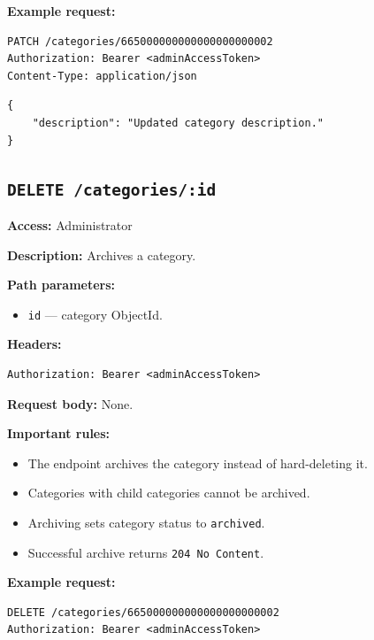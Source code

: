 \textbf{Example request:}

\begin{verbatim}
PATCH /categories/665000000000000000000002
Authorization: Bearer <adminAccessToken>
Content-Type: application/json
\end{verbatim}

\begin{verbatim}
{
    "description": "Updated category description."
}
\end{verbatim}

\subsection{\texttt{DELETE /categories/:id}}

\textbf{Access:} Administrator

\textbf{Description:} Archives a category.

\textbf{Path parameters:}

\begin{itemize}
    \item \texttt{id} --- category ObjectId.
\end{itemize}

\textbf{Headers:}

\begin{verbatim}
Authorization: Bearer <adminAccessToken>
\end{verbatim}

\textbf{Request body:} None.

\textbf{Important rules:}

\begin{itemize}
    \item The endpoint archives the category instead of hard-deleting it.
    \item Categories with child categories cannot be archived.
    \item Archiving sets category status to \texttt{archived}.
    \item Successful archive returns \texttt{204 No Content}.
\end{itemize}

\textbf{Example request:}

\begin{verbatim}
DELETE /categories/665000000000000000000002
Authorization: Bearer <adminAccessToken>
\end{verbatim}